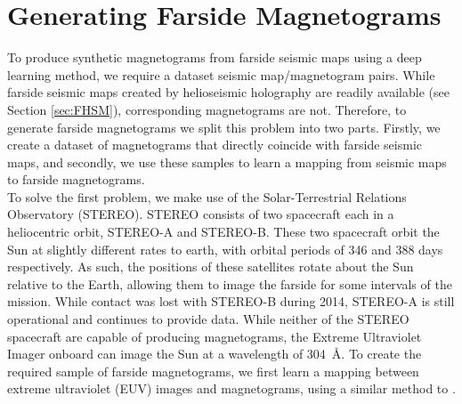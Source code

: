 \documentclass[11pt,a4paper,onecolumn]{report}
\begin{document}
\section{Generating Farside Magnetograms}
\label{sec:outlook}

To produce synthetic magnetograms from farside seismic maps using a deep
learning method, we require a dataset seismic map/magnetogram pairs. While
farside seismic maps created by helioseismic holography are readily available
(see Section \ref{sec:FHSM}), corresponding magnetograms are not. Therefore, to
generate farside magnetograms we split this problem into two parts. Firstly, we
create a dataset of magnetograms that directly coincide with farside seismic
maps, and secondly, we use these samples to learn a mapping from seismic
maps to farside magnetograms. \\

To solve the first problem, we make use of the Solar-Terrestrial Relations
Observatory (STEREO). STEREO consists of two spacecraft each in a heliocentric
orbit, STEREO-A and STEREO-B. These two spacecraft orbit the Sun at slightly
different rates to earth, with orbital periods of 346 and 388 days respectively.
As such, the positions of these satellites rotate about the Sun relative to the
Earth, allowing them to image the farside for some intervals of the mission.
While contact was lost with STEREO-B during 2014, STEREO-A is still operational
and continues to provide data. While neither of the STEREO spacecraft are
capable of producing magnetograms, the Extreme Ultraviolet Imager onboard can
image the Sun at a wavelength of \SI{304}{\angstrom}. To create the required
sample of farside magnetograms, we first learn a mapping between extreme
ultraviolet (EUV) images and magnetograms, using a similar method to
\citet{Kim2019}.\\
\end{document}
